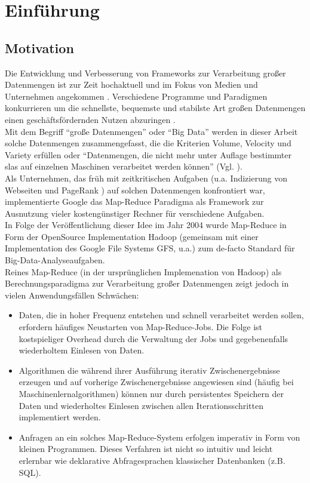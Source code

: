 \chapter{Einführung}

\section{Motivation}

Die Entwicklung und Verbesserung von Frameworks zur Verarbeitung großer Datenmengen ist zur Zeit hochaktuell und im Fokus von Medien und Unternehmen angekommen \cite{Bit14}. Verschiedene Programme und Paradigmen konkurrieren um die schnellste, bequemste und stabilste Art großen Datenmengen einen geschäftsfördernden Nutzen abzuringen \cite{Sin14}.\\

Mit dem Begriff "`große Datenmengen"' oder "`Big Data"' werden in dieser Arbeit solche Datenmengen zusammengefasst, die die Kriterien Volume, Velocity und Variety \cite{Lan01} erfüllen oder "`Datenmengen, die nicht mehr unter Auflage bestimmter \gls{sla}s auf einzelnen Maschinen verarbeitet werden können"' (Vgl. \cite{Sam14}).\\

Als Unternehmen, das früh mit zeitkritischen Aufgaben (u.a.  Indizierung von Webseiten und PageRank \cite{page2001method}) auf solchen Datenmengen konfrontiert war, implementierte Google das Map-Reduce Paradigma \cite{Dean04} als Framework zur Ausnutzung vieler kostengünstiger Rechner für verschiedene Aufgaben. \\

In Folge der Veröffentlichung dieser Idee im Jahr 2004 wurde Map-Reduce in Form der OpenSource Implementation Hadoop (gemeinsam mit einer Implementation des Google File Systems GFS, u.a.) \cite{Ghema03} zum de-facto Standard für Big-Data-Analyseaufgaben.\\

Reines Map-Reduce (in der ursprünglichen Implemenation von Hadoop) als Berechnungsparadigma zur Verarbeitung großer Datenmengen zeigt jedoch in vielen Anwendungsfällen Schwächen:
\begin{itemize}
	\item Daten, die in hoher Frequenz entstehen und schnell verarbeitet werden sollen, erfordern häufiges Neustarten von Map-Reduce-Jobs. Die Folge ist kostspieliger Overhead durch die Verwaltung der Jobs und gegebenenfalls wiederholtem Einlesen von Daten.
	\item Algorithmen die während ihrer Ausführung iterativ Zwischenergebnisse erzeugen und auf vorherige Zwischenergebnisse angewiesen sind (häufig bei Maschinenlernalgorithmen) können nur durch persistentes Speichern der Daten und wiederholtes Einlesen zwischen allen Iterationsschritten implementiert werden.
	\item Anfragen an ein solches Map-Reduce-System erfolgen imperativ in Form von kleinen Programmen. Dieses Verfahren ist nicht so intuitiv und leicht erlernbar wie deklarative Abfragesprachen klassischer Datenbanken (z.B. SQL).
\end{itemize}

